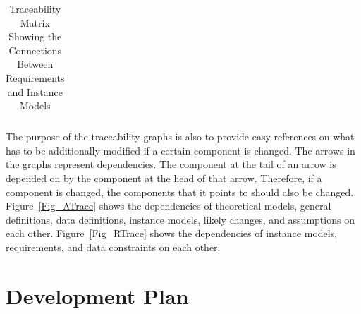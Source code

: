 \documentclass[12pt]{article}
\begin{document}
\begin{table}[h!]
\centering
\begin{tabular}{|c|c|c|c|c|c|c|c|}
\hline

\hline
\end{tabular}
\caption{Traceability Matrix Showing the Connections Between Requirements and Instance Models}
\label{Table:R_trace}
\end{table}

The purpose of the traceability graphs is also to provide easy references on
what has to be additionally modified if a certain component is changed.  The
arrows in the graphs represent dependencies. The component at the tail of an
arrow is depended on by the component at the head of that arrow. Therefore, if a
component is changed, the components that it points to should also be
changed. Figure~\ref{Fig_ATrace} shows the dependencies of theoretical models,
general definitions, data definitions, instance models, likely changes, and
assumptions on each other. Figure~\ref{Fig_RTrace} shows the dependencies of
instance models, requirements, and data constraints on each other.




\section{Development Plan}

\end{document}
